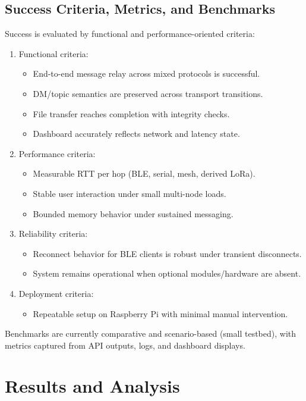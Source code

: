 \documentclass[conference]{IEEEtran}
\begin{document}
\subsection{Success Criteria, Metrics, and Benchmarks}
Success is evaluated by functional and performance-oriented criteria:
\begin{enumerate}
\item Functional criteria:
\begin{itemize}
\item End-to-end message relay across mixed protocols is successful.
\item DM/topic semantics are preserved across transport transitions.
\item File transfer reaches completion with integrity checks.
\item Dashboard accurately reflects network and latency state.
\end{itemize}
\item Performance criteria:
\begin{itemize}
\item Measurable RTT per hop (BLE, serial, mesh, derived LoRa).
\item Stable user interaction under small multi-node loads.
\item Bounded memory behavior under sustained messaging.
\end{itemize}
\item Reliability criteria:
\begin{itemize}
\item Reconnect behavior for BLE clients is robust under transient disconnects.
\item System remains operational when optional modules/hardware are absent.
\end{itemize}
\item Deployment criteria:
\begin{itemize}
\item Repeatable setup on Raspberry Pi with minimal manual intervention.
\end{itemize}
\end{enumerate}

Benchmarks are currently comparative and scenario-based (small testbed), with metrics captured from API outputs, logs, and dashboard displays.

\section{Results and Analysis}
\end{document}
